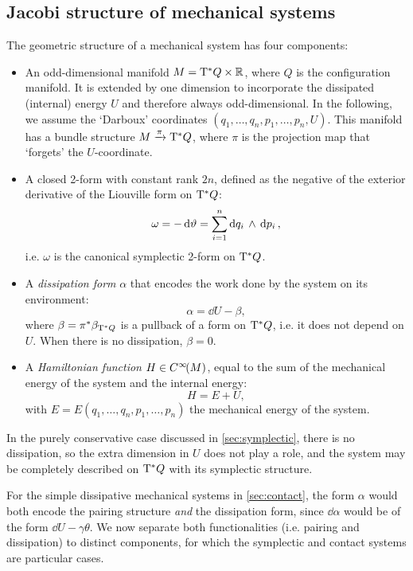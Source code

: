 \subsection{Jacobi structure of mechanical systems}
The geometric structure of a mechanical system has four components:
\begin{itemize}
    \item An odd-dimensional manifold \(M = \mathrm{T}^*Q\times \mathbb{R}\), where \(Q\) is the configuration manifold. It is extended by one dimension to incorporate the dissipated (internal) energy \(U\) and therefore always odd-dimensional. In the following, we assume the `Darboux' coordinates \((q_1, \ldots, q_n, p_1, \ldots, p_n, U)\).
    This manifold has a bundle structure \(M\xrightarrow[]{\pi}\mathrm{T}^*Q\), where \(\pi\) is the projection map that `forgets' the \(U\)-coordinate.
    \item A closed 2-form with constant rank \(2n\), defined as the negative of the exterior derivative of the Liouville form on \(\mathrm{T}^*Q\):
        \begin{equation}
     \omega = -\dd{\vartheta} = \sum^n_{i=1}  \dd{q_i}\,\wedge\,\dd{p_i} ,
\end{equation}
        i.e. \(\omega\) is the canonical symplectic 2-form on \(\mathrm{T}^*Q\).
    \item A \emph{dissipation form} \(\alpha\) that encodes the work done by the system on its environment:
        \begin{equation}
     \alpha = \dd{U} - \beta,
\end{equation}
        where \(\beta = \pi^*\beta_{\mathrm{T}^*Q}\) is a pullback of a form on \(\mathrm{T}^*Q\), i.e. it does not depend on \(U\). When there is no dissipation, \(\beta = 0\).
    \item A \emph{Hamiltonian function} \(H \in C^\infty\!\qty(M)\), equal to the sum of the mechanical energy of the system and the internal energy:
        \begin{equation}
     H = E + U,
\end{equation}
        with \(E = E(q_1, \ldots, q_n, p_1, \ldots, p_n)\) the mechanical energy of the system.
\end{itemize}

In the purely conservative case discussed in \cref{sec:symplectic}, there is no dissipation, so the extra dimension in \(U\) does not play a role, and the system may be completely described on \(\mathrm{T}^*Q\) with its symplectic structure. 

For the simple dissipative mechanical systems in \cref{sec:contact}, the form \(\alpha\) would both encode the pairing structure \emph{and} the dissipation form, since \(\dd{\alpha}\) would be of the form \(\dd{U} - \gamma \theta\).  We now separate both functionalities (i.e. pairing and dissipation) to distinct components, for which the symplectic and contact systems are particular cases.

